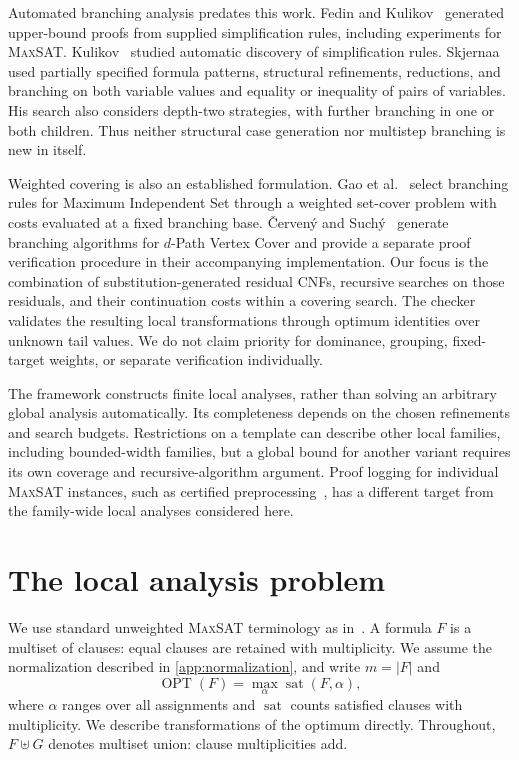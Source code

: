 \documentclass[11pt]{article}
\newcommand{\MaxSAT}{\textnormal{\textsc{MaxSAT}}}
\newcommand{\OPT}{\operatorname{OPT}}
\theoremstyle{definition}
\theoremstyle{remark}
\begin{document}
Automated branching analysis predates this work. Fedin and
Kulikov~\cite{FedinKulikov2004} generated upper-bound proofs from supplied
simplification rules, including experiments for \MaxSAT{}.
Kulikov~\cite{Kulikov2005} studied automatic discovery of simplification
rules. Skjernaa~\cite[Chapter~8]{Skjernaa2004} used partially specified
formula patterns, structural refinements, reductions, and branching on both
variable values and equality or inequality of pairs of variables. His search
also considers depth-two strategies, with further branching in one or both
children. Thus neither structural case generation nor multistep branching is
new in itself.

Weighted covering is also an established formulation. Gao et
al.~\cite{GaoEtAl2024} select branching rules for Maximum Independent Set
through a weighted set-cover problem with costs evaluated at a fixed
branching base. \v{C}erven\'y and Such\'y~\cite{CervenySuchy2023} generate
branching algorithms for $d$-Path Vertex Cover and provide a separate proof
verification procedure in their accompanying implementation.%
Our focus is
the combination of substitution-generated residual CNFs, recursive searches
on those residuals, and their continuation costs within a covering search.
The checker validates the resulting local transformations through optimum
identities over unknown tail values. We do not claim priority for dominance,
grouping, fixed-target weights, or separate verification individually.

The framework constructs finite local analyses, rather than solving an
arbitrary global analysis automatically. Its completeness depends on the
chosen refinements and search budgets. Restrictions on a template can describe
other local families, including bounded-width families, but a global bound
for another variant requires its own coverage and recursive-algorithm
argument. Proof logging for individual \MaxSAT{} instances, such as certified
preprocessing~\cite{IhalainenEtAl2024}, has a different target from the
family-wide local analyses considered here.

\section{The local analysis problem}
\label{sec:preliminaries}

We use standard unweighted \MaxSAT{} terminology as in~\cite{Xiao2022}.
A formula $F$ is a multiset of clauses: equal clauses are retained with
multiplicity. We assume the normalization described in
\cref{app:normalization}, and write $m=|F|$ and
\[
  \OPT(F)=\max_{\alpha}\operatorname{sat}(F,\alpha),
\]
where $\alpha$ ranges over all assignments and $\operatorname{sat}$ counts
satisfied clauses with multiplicity. We describe transformations of the
optimum directly.
Throughout, $F\uplus G$ denotes multiset union: clause multiplicities add.
\end{document}
